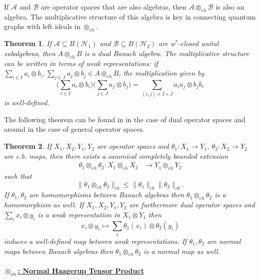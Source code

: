 \documentclass[12pt]{article}
\newtheorem{theorem}{Theorem}[section]
\theoremstyle{definition}
\newcommand{\mc}[1]{\mathcal{#1}}
\newcommand{\<}{\langle}
\renewcommand{\>}{\rangle}
\renewcommand{\subset}{\subseteq}
\newcommand{\eh}{\otimes_{eh}}
\begin{document}
If $\mc A$ and $\mc B$ are operator spaces that are also algebras, then $\mc A \eh \mc B$ is also an algebra. The multiplicative structure of this algebra is key in connecting quantum graphs with left ideals in $\eh$.

\begin{theorem} \cite[Section 4]{blecher-smith-w*h}
    If $\mc A \subset B(\mc H_1)$ and $\mc B \subset B(\mc H_2)$ are w$^*$-closed unital subalgebras, then $A \eh B$ is a dual Banach algebra. The multiplicative structure can be written in terms of weak representations: if $\sum_{i \in I} a_i \otimes b_i, \sum_{j \in J} a_j \otimes b_j \in A \eh B$, the multiplication given by
    \[
    \bigg(\sum_{i \in I} a_i \otimes b_i\bigg)\bigg(\sum_{j \in J} a_j \otimes b_j\bigg) = \sum_{(i,j) \in I \times J} a_ia_j\otimes b_jb_i
    \]
    is well-defined.
\end{theorem}

The following theorem can be found in \cite{blecher-lemerdy} in the case of dual operator spaces and around \cite{opsp-hopf} in the case of general operator spaces.

\begin{theorem} \cites[1.6.9 (Weak$^*$ Haagerup tensor product)]{blecher-lemerdy}[Lemma 5.4]{opsp-hopf} \label{thm: eh extension}
    If $X_1, X_2, Y_1, Y_2$ are operator spaces and $\theta_1: X_1 \to Y_1$, $\theta_2: X_2 \to Y_2$ are c.b. maps, then there exists a canonical completely bounded extension
    \begin{align*}
        \theta_1 \otimes_{eh} \theta_2 : X_1 \otimes_{eh} X_2 &\to Y_1 \otimes_{eh} Y_2
    \end{align*}
    such that 
    \[
    \|\theta_1 \otimes_{eh} \theta_2\|_{cb} \leq \|\theta_1\|_{cb}\|\theta_2\|_{cb}.
    \]
    If $\theta_1,\theta_2$ are homomorphisms between Banach algebras then $\theta_1 \otimes_{eh} \theta_2$ is a homomorphism as well. If $X_1, X_2, Y_1, Y_2$ are furthermore dual operator spaces and $\sum_i x_i \otimes y_i$ is a weak representation in $X_1 \otimes Y_1$ then
    \[
    x_i \otimes y_i \mapsto \sum_i \theta_1(x_i) \otimes \theta_2(y_i)
    \]
    induces a well-defined map between weak representations. If $\theta_1,\theta_2$ are normal maps between Banach algebras then $\theta_1 \otimes_{eh} \theta_2$ is a normal map as well.
\end{theorem}

\paragraph{\underline{$\otimes_{\sigma h}$: Normal Haagerup Tensor Product}}
\end{document}
